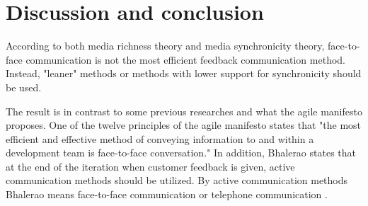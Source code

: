 \documentclass[conference]{IEEEtran}
\begin{document}
\begin{comment}

NOPEA PÄÄTELMÄ: 
MST: Feedback: 

Contexti: Familiar, käytännössä siis: high conveyance, low convergence ==> less synchronicity

P1: Lower synchronicity
P2: Trasmission velocity improves synchronicity -> Lower transmission velovity
P3: Parallelism lower synchronicity -> High parallelism
P4(a): Natural symbols support synchronicity -> Use unnatural symbols
P4(b): Symbols better suited to content support synchronicity -> Use ill suited symbols
P5: Rehearsability lowers synchronicity -> High rehearsability
P6: Reproducability lowers synch -> High reproducability

--> 

lower transmission velocity, high parallelism, reharsability is important, high reprocessability -> Elektoriseen muotoon


\section{Call for new methods for feedback communication}

\textbf{TODO:} Why there's a need for new methods?

\textbf{TODO:} Introduce Hannotaatio

\textbf{TODO:} Evaluate Hannotaatio based on MRT and MST

\end{comment}

\section{Discussion and conclusion}

According to both media richness theory and media synchronicity theory, face-to-face communication is not the most efficient feedback communication method. Instead, "leaner" methods or methods with lower support for synchronicity should be used.

The result is in contrast to some previous researches and what the agile manifesto proposes. One of the twelve principles of the agile manifesto states that "the most efficient and effective method of conveying information to and within a development team is face-to-face conversation." \cite{agilemanifesto} In addition, Bhalerao states that at the end of the iteration when customer feedback is given, active communication methods should be utilized. By active communication methods Bhalerao means face-to-face communication or telephone communication \cite{2010bhalerao}.
\end{document}
